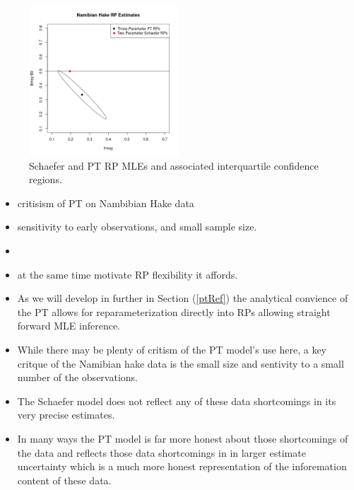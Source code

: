\documentclass[12pt]{ucscthesis}
\begin{document}
%
\begin{figure}
%
\includegraphics[width=0.5\textwidth]{../edits/namibibRP.png}
\vspace{-1cm}
\caption{
Schaefer and PT RP MLEs and associated interquartile confidence regions.  
}
\label{bhFmsy}
\end{figure}

{\color{red}
\begin{itemize}
\item critisism of PT on Nambibian Hake data
\item sensitivity to early observations, and small sample size.
\item \cite{punt_model_1988} \cite{hilborn_ecological_1997} \cite{rankin_alternative_2015}
\item at the same time motivate RP flexibility it affords.
%
\item As we will develop in further in Section (\ref{ptRef}) the analytical convience of the PT allows for reparameterization directly into RPs allowing straight forward MLE inference.
\item While there may be plenty of critism of the PT model's use here, a key critque of the Namibian hake data is the small size and sentivity to a small number of the observations. %
\item The Schaefer model does not reflect any of these data shortcomings in its very precise estimates.
\item In many ways the PT model is far more honest about those shortcomings of the data and reflects those data shortcomings in in larger estimate uncertainty which is a much more honest representation of the inforemation content of these data.
\end{itemize}
\clearpage}
\end{document}

